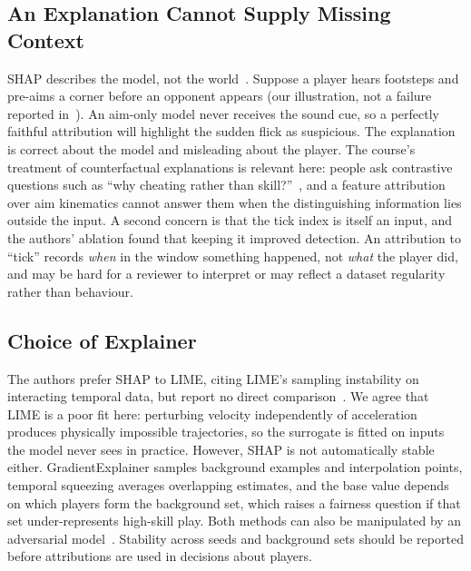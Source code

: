 \documentclass[conference]{IEEEtran}
\begin{document}
\subsection{An Explanation Cannot Supply Missing Context}
SHAP describes the model, not the world~\cite{kumar2020problems}. Suppose a player hears footsteps and pre-aims a corner before an opponent appears (our illustration, not a failure reported in~\cite{zhang2026xguardian}). An aim-only model never receives the sound cue, so a perfectly faithful attribution will highlight the sudden flick as suspicious. The explanation is correct about the model and misleading about the player. The course's treatment of counterfactual explanations is relevant here: people ask contrastive questions such as ``why cheating rather than skill?''~\cite{miller2019explanation}, and a feature attribution over aim kinematics cannot answer them when the distinguishing information lies outside the input. A second concern is that the tick index is itself an input, and the authors' ablation found that keeping it improved detection. An attribution to ``tick'' records \emph{when} in the window something happened, not \emph{what} the player did, and may be hard for a reviewer to interpret or may reflect a dataset regularity rather than behaviour.

\subsection{Choice of Explainer}
The authors prefer SHAP to LIME, citing LIME's sampling instability on interacting temporal data, but report no direct comparison~\cite{zhang2026xguardian}. We agree that LIME is a poor fit here: perturbing velocity independently of acceleration produces physically impossible trajectories, so the surrogate is fitted on inputs the model never sees in practice. However, SHAP is not automatically stable either. GradientExplainer samples background examples and interpolation points, temporal squeezing averages overlapping estimates, and the base value depends on which players form the background set, which raises a fairness question if that set under-represents high-skill play. Both methods can also be manipulated by an adversarial model~\cite{slack2020fooling}. Stability across seeds and background sets should be reported before attributions are used in decisions about players.
\end{document}
